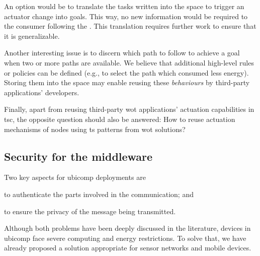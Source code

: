 An option would be to translate the tasks written into the space to trigger an actuator change into goals.
This way, no new information would be required to the consumer following the \spaceActuation{}.
This translation requires further work to ensure that it is generalizable.

% 
Another interesting issue is to discern which path to follow to achieve a goal when two or more paths are available.
We believe that additional high-level rules or policies can be defined (e.g., to select the path which consumed less energy).
Storing them into the space may enable reusing these \emph{behaviours} by third-party applications' developers.

Finally, apart from reusing third-party \ac{wot} applications' actuation capabilities in \ac{tsc}, the opposite question should also be answered:
How to reuse actuation mechanisms of nodes using \ac{ts} patterns from \ac{wot} solutions?


\subsection{Security for the middleware}

Two key aspects for \ac{ubicomp} deployments are
\begin{enumerate*}[label=\itshape(\arabic*\upshape)]
  \item to authenticate the parts involved in the communication; and
  \item to ensure the privacy of the message being transmitted.
\end{enumerate*}
Although both problems have been deeply discussed in the literature,
devices in \ac{ubicomp} face severe computing and energy restrictions.
To solve that, we have already proposed a solution appropriate for sensor networks and mobile devices.

